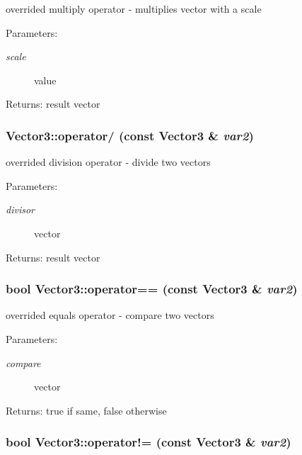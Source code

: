 overrided multiply operator - multiplies vector with a scale \begin{Desc}
\item[Parameters:]
\begin{description}
\item[{\em scale}]value \end{description}
\end{Desc}
\begin{Desc}
\item[Returns:]result vector \end{Desc}
\hypertarget{class_vector3_0ab08b15cded7fd294334233b8157c05}{
\subsubsection[operator/]{ Vector3::operator/ (const {\bf Vector3} \& {\em var2})}}
\label{class_vector3_0ab08b15cded7fd294334233b8157c05}


overrided division operator - divide two vectors \begin{Desc}
\item[Parameters:]
\begin{description}
\item[{\em divisor}]vector \end{description}
\end{Desc}
\begin{Desc}
\item[Returns:]result vector \end{Desc}
\hypertarget{class_vector3_b420e00a2a719c5340743a0cb3154560}{
\subsubsection[operator==]{\setlength{\rightskip}{0pt plus 5cm}bool Vector3::operator== (const {\bf Vector3} \& {\em var2})}}
\label{class_vector3_b420e00a2a719c5340743a0cb3154560}


overrided equals operator - compare two vectors \begin{Desc}
\item[Parameters:]
\begin{description}
\item[{\em compare}]vector \end{description}
\end{Desc}
\begin{Desc}
\item[Returns:]true if same, false otherwise \end{Desc}
\hypertarget{class_vector3_1023dd678979df4187bd2447bff67b5c}{
\subsubsection[operator"!=]{\setlength{\rightskip}{0pt plus 5cm}bool Vector3::operator!= (const {\bf Vector3} \& {\em var2})}}
\label{class_vector3_1023dd678979df4187bd2447bff67b5c}


